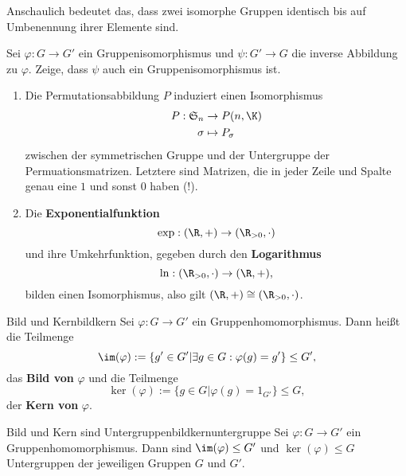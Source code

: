 \begin{bemerkung}
Anschaulich bedeutet das, dass zwei isomorphe Gruppen identisch bis auf Umbenennung ihrer Elemente sind.
\end{bemerkung}
\begin{übung}\label{exc:inverseistisomorphismus}
Sei $\varphi: G \to G'$ ein Gruppenisomorphismus und $\psi: G' \to G$ die inverse Abbildung zu $\varphi$. Zeige, dass $\psi$ auch ein Gruppenisomorphismus ist.
\end{übung}
\begin{beispiele}
\begin{enumerate}
\item Die Permutationsabbildung $P$ induziert einen Isomorphismus
\begin{align}
P: \mathfrak{S}_n &\to P(n, \K)\\
\sigma &\mapsto P_\sigma
\end{align}
zwischen der symmetrischen Gruppe und der Untergruppe der Permuationsmatrizen. Letztere sind Matrizen, die in jeder Zeile und Spalte genau eine $1$ und sonst $0$ haben (!).
\item Die \textbf{Exponentialfunktion}
\begin{equation}
\exp: (\R, +) \to (\R_{> 0}, \cdot)
\end{equation}
und ihre Umkehrfunktion, gegeben durch den \textbf{Logarithmus}
\begin{equation}
\ln: (\R_{>0}, \cdot) \to (\R, +),
\end{equation}
bilden einen Isomorphismus, also gilt $(\R, +) \cong (\R_{>0}, \cdot)$.
\end{enumerate}
\end{beispiele}
\begin{definition}{Bild und Kern}{bildkern}
Sei $\varphi: G \to G'$ ein Gruppenhomomorphismus. Dann heißt die Teilmenge
\begin{equation}
\im (\varphi) := \{g' \in G' | \exists g \in G: \varphi(g) = g'\} \leq G',
\end{equation}
das \textbf{Bild von} $\varphi$ und die Teilmenge
\begin{equation}
\ker (\varphi) := \{g \in G|\varphi(g) = 1_{G'} \} \leq G,
\end{equation}
der \textbf{Kern von} $\varphi$.
\end{definition}
\begin{satz}{Bild und Kern sind Untergruppen}{bildkernuntergruppe}
Sei $\varphi: G \to G'$ ein Gruppenhomomorphismus. Dann sind $\im (\varphi) \leq G'$ und $\ker (\varphi) \leq G$ Untergruppen der jeweiligen Gruppen $G$ und $G'$.
\end{satz}
